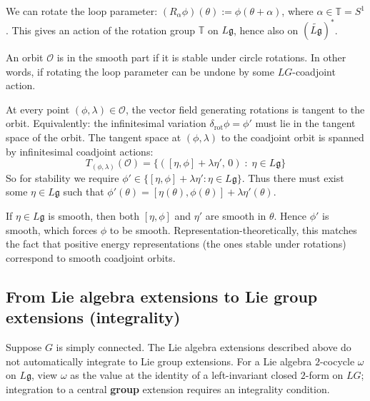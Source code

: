 \documentclass[12pt]{article}
\begin{document}
\begin{remark}
    We can rotate the loop parameter: $(R_\alpha\phi)(\theta) := \phi(\theta+\alpha)$, where $\alpha\in\mathbb T=S^1$. This gives an action of the rotation group $\mathbb T$ on $L\mathfrak g$, hence also on $(\widetilde{L\mathfrak g})^*$.

    An orbit $\mathcal O$ is in the smooth part if it is stable under circle rotations. In other words, if rotating the loop parameter can be undone by some $LG$-coadjoint action.

    At every point $(\phi,\lambda)\in\mathcal O$, the vector field generating rotations is tangent to the orbit. Equivalently: the infinitesimal variation $\delta_{\mathrm{rot}}\phi = \phi'$ must lie in the tangent space of the orbit. The tangent space at $(\phi,\lambda)$ to the coadjoint orbit is spanned by infinitesimal coadjoint actions: \[T_{(\phi,\lambda)}(\mathcal O) = \{([\eta,\phi] + \lambda \eta',\,0)\;:\; \eta \in L\mathfrak g\}\]
    So for stability we require $\phi' \in \{[\eta,\phi] + \lambda \eta' : \eta\in L\mathfrak g\}$. Thus there must exist some $\eta \in L\mathfrak g$ such that $\phi'(\theta) = [\eta(\theta),\phi(\theta)] + \lambda \eta'(\theta)$.

    If $\eta \in L\mathfrak g$ is smooth, then both $[\eta,\phi]$ and $\eta'$ are smooth in $\theta$. Hence $\phi'$ is smooth, which forces $\phi$ to be smooth. Representation-theoretically, this matches the fact that positive energy representations (the ones stable under rotations) correspond to smooth coadjoint orbits.
\end{remark}



\subsection{From Lie algebra extensions to Lie group extensions (integrality)}
Suppose $G$ is simply connected. The Lie algebra extensions described above do not automatically integrate to Lie group extensions. For a Lie algebra $2$-cocycle $\omega$ on $L\mathfrak g$, view $\omega$ as the value at the identity of a left-invariant closed $2$-form on $LG$; integration to a central \textbf{group} extension requires an integrality condition.
\end{document}
